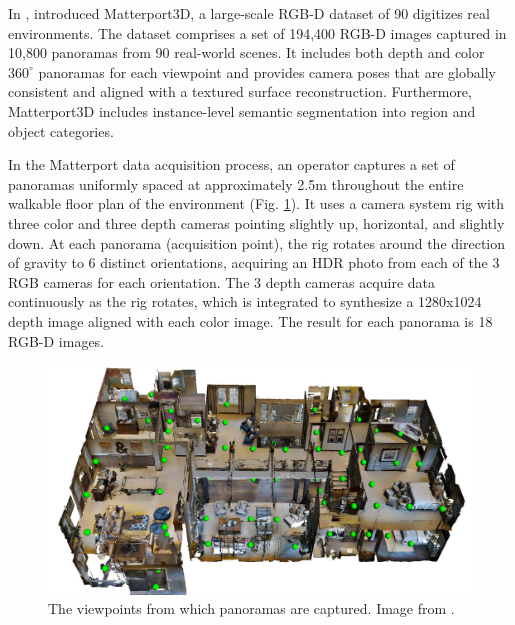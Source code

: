 In \citeyear{matterport}, \citeauthor{matterport} introduced Matterport3D, a large-scale RGB-D dataset of 90 digitizes real environments. The dataset comprises a set of 194,400 RGB-D images captured in 10,800 panoramas from 90 real-world scenes. It includes both depth and color $360^{\circ} $ panoramas for each viewpoint and provides camera poses that are globally consistent and aligned with a textured surface reconstruction. Furthermore, Matterport3D includes instance-level semantic segmentation into region and object categories.

In the Matterport data acquisition process, an operator captures
a set of panoramas uniformly spaced at approximately 2.5m
throughout the entire walkable floor plan of the environment (Fig. \ref{fig:matterport-panoramas}). It uses a camera system rig with three color and three depth cameras pointing slightly up, horizontal, and slightly down. At each panorama (acquisition point), the rig rotates around the direction of gravity to
6 distinct orientations, acquiring an HDR photo from each of the 3 RGB cameras for each orientation. The 3 depth cameras acquire data continuously as the rig rotates, which is integrated to synthesize a 1280x1024 depth image aligned
with each color image. The result for each panorama is 18 RGB-D images. 

\begin{figure}[h!]
	\centering
	\includegraphics[width=\textwidth]{images/panoramas.pdf}
	\caption{The viewpoints from which panoramas are captured. Image from \cite{matterport}.}
	\label{fig:matterport-panoramas}
\end{figure}

